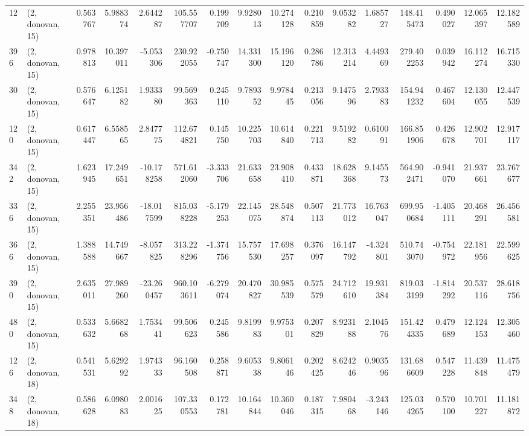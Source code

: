 \begin{tabular}{llrrrrrrrrrrrrrr}
12  &  (2, donovan, 15) &   0.563767 &   5.988374 &   2.644287 &   105.557707 &   0.199709 &   9.928013 &  10.274128 &  0.210859 &   9.053282 &   1.685727 &   148.415473 &   0.490027 &  12.065397 &  12.182589 \\
396 &  (2, donovan, 15) &   0.978813 &  10.397011 &  -5.053306 &   230.922055 &  -0.750747 &  14.331300 &  15.196120 &  0.286786 &  12.313214 &   4.449369 &   279.402253 &   0.039942 &  16.112274 &  16.715330 \\
30  &  (2, donovan, 15) &   0.576647 &   6.125182 &   1.933380 &    99.569363 &   0.245110 &   9.789352 &   9.978445 &  0.213056 &   9.147596 &   2.793383 &   154.941232 &   0.467604 &  12.130055 &  12.447539 \\
120 &  (2, donovan, 15) &   0.617447 &   6.558565 &   2.847775 &   112.674821 &   0.145750 &  10.225703 &  10.614840 &  0.221713 &   9.519282 &   0.610091 &   166.851906 &   0.426678 &  12.902701 &  12.917117 \\
342 &  (2, donovan, 15) &   1.623945 &  17.249651 & -10.178258 &   571.612060 &  -3.333706 &  21.633658 &  23.908410 &  0.433871 &  18.628368 &   9.145573 &   564.902471 &  -0.941070 &  21.937661 &  23.767677 \\
336 &  (2, donovan, 15) &   2.255351 &  23.956486 & -18.017599 &   815.038228 &  -5.179253 &  22.145075 &  28.548874 &  0.507113 &  21.773012 &  16.763047 &   699.950684 &  -1.405111 &  20.468291 &  26.456581 \\
366 &  (2, donovan, 15) &   1.388588 &  14.749667 &  -8.057825 &   313.228296 &  -1.374756 &  15.757530 &  17.698257 &  0.376097 &  16.147792 &  -4.324801 &   510.743070 &  -0.754972 &  22.181956 &  22.599625 \\
390 &  (2, donovan, 15) &   2.635011 &  27.989260 & -23.260457 &   960.103611 &  -6.279074 &  20.470827 &  30.985539 &  0.575579 &  24.712610 &  19.931384 &   819.033199 &  -1.814292 &  20.537116 &  28.618756 \\
480 &  (2, donovan, 15) &   0.533632 &   5.668268 &   1.753441 &    99.506623 &   0.245586 &   9.819983 &   9.975301 &  0.207829 &   8.923188 &   2.104576 &   151.424335 &   0.479689 &  12.124153 &  12.305460 \\
126 &  (2, donovan, 18) &   0.541531 &   5.629292 &   1.974333 &    96.160508 &   0.258871 &   9.605338 &   9.806146 &  0.202425 &   8.624246 &   0.903596 &   131.686609 &   0.547228 &  11.439848 &  11.475479 \\
348 &  (2, donovan, 18) &   0.586628 &   6.098083 &   2.001625 &   107.330553 &   0.172781 &  10.164844 &  10.360046 &  0.187315 &   7.980468 &  -3.243146 &   125.034265 &   0.570100 &  10.701227 &  11.181872 \\

\end{tabular}
